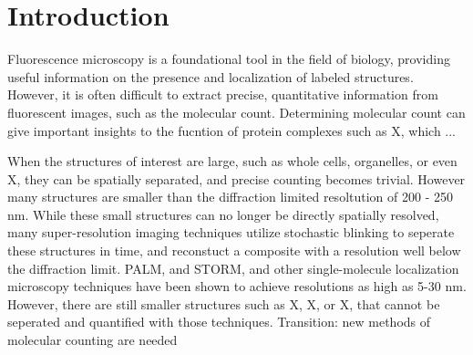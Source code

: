 \section{Introduction}


Fluorescence microscopy is a foundational tool in the field of biology,
  providing useful information on the presence and localization 
  of labeled structures.
%
  However, it is often difficult to extract precise, quantitative information
  from fluorescent images, such as the molecular count.
  Determining molecular count can give important insights to the fucntion
  of protein complexes such as X, which ...

When the structures of interest are large, such as whole cells, organelles,
  or even X, they can be spatially separated, and precise counting becomes trivial.
  However many structures are smaller than the diffraction limited resoltution of 200 - 250 nm.
%
While these small structures can no longer be directly spatially resolved, many super-resolution 
  imaging techniques utilize stochastic blinking to seperate these structures in time,
  and reconstuct a composite with a resolution well below the diffraction limit. 
  PALM, and STORM, and other single-molecule localization microscopy techniques
  have been shown to achieve resolutions as high as 5-30 nm.
  However, there are still smaller structures such as X, X, or X, that 
  cannot be seperated and quantified with those techniques.
  Transition: new methods of molecular counting are needed

